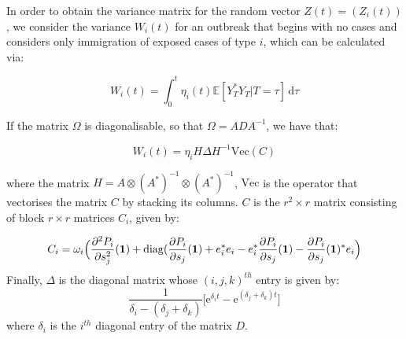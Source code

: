 \documentclass{article}
\begin{document}
 
In order to obtain the variance matrix for the random vector $Z(t) = (Z_i(t))$, we consider the variance $W_i(t)$ for an outbreak that begins with no cases and considers only immigration of exposed cases of type $i$, which can be calculated via:

\begin{equation}
W_i(t) = \int_0^t \eta_i(t) {\mathbb{E}}[Y_T^*Y_T | T=\tau] \, {\mathrm{d}}\tau
\end{equation}

If the matrix $\Omega$ is diagonalisable, so that $\Omega = ADA^{-1}$, we have that:

\begin{equation}
W_i(t) = \eta_i H\Delta H^{-1} {\mathrm{Vec}}(C)
\end{equation}
 
where the matrix $H= A \otimes (A^*)^{-1} \otimes (A^*)^{-1}$, ${\mathrm{Vec}}$ is the operator that vectorises the matrix $C$ by stacking its columns. $C$ is the $r^2 \times r$ matrix consisting of block $r \times r$ matrices $C_i$, given by:

\begin{equation}
C_i = \omega_i\Big(\frac{\partial^2 P_i}{\partial s_j^2}({\vb{1}}) + {\mathrm{diag}}(\frac{\partial P_i}{\partial s_j}({\vb{1}}) + e_i^*e_i - e_i^* \frac{\partial P_i}{\partial s_j}({\vb{1}}) - \frac{\partial P_i}{\partial s_j}({\vb{1}})^*e_i\Big)
\end{equation}
Finally, $\Delta$ is the diagonal matrix whose $(i, j, k)^{th}$ entry is given by:
\begin{equation}
\frac{1}{\delta_i - (\delta_j + \delta_k)}\big[{\mathrm{e}}^{\delta_i t} - {\mathrm{e}}^{(\delta_j + \delta_k) t}\big] 
\end{equation}
where $\delta_i$ is the $i^{th}$ diagonal entry of the matrix $D$. 





\end{document}

